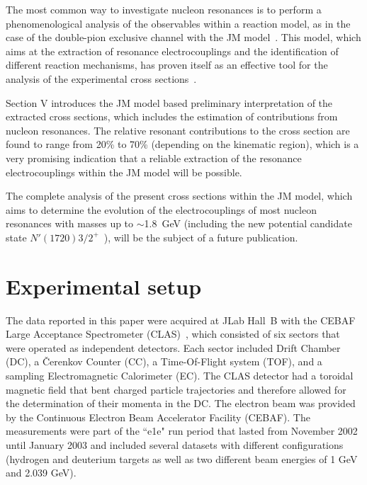 \documentclass[prc,twocolumn,superscriptaddress,showpacs,amssymb,amsmath,amsfonts,aps,nofootinbib]{revtex4-1}
\begin{document}
The most common way to investigate  nucleon resonances  is to perform a phenomenological analysis of the observables within a reaction model, as in the case of the double-pion exclusive channel with the JM  model~\cite{Mokeev:2015lda}. This model, which aims at the extraction of resonance electrocouplings and the identification of different reaction mechanisms, has proven itself as an effective tool for the analysis of the experimental cross sections~\cite{Mokeev:2008iw,Mokeev:2012vsa,Mokeev:2015lda}.





Section V introduces the JM model based preliminary interpretation of the extracted cross sections, which includes the estimation of  contributions from nucleon resonances. 
The relative resonant contributions to the cross section are found to range from 20\% to 70\% (depending on the kinematic region), which is a very promising indication that a reliable extraction of the resonance electrocouplings within the JM model will be possible.


The complete analysis of the present cross sections within the JM model, which aims to determine the evolution of the electrocouplings of most nucleon resonances  with masses up to $\sim$1.8~GeV (including the new potential candidate state
$N'(1720)3/2^+$~\cite{Mokeev:2015moa}), will be the subject of a future publication. 





\section{Experimental setup}



The data reported in this paper were acquired at JLab Hall~B  with the CEBAF Large Acceptance Spectrometer (CLAS)~\cite{Me03}, which consisted of six sectors that were operated as independent detectors. Each sector included Drift Chamber (DC), a \v Cerenkov Counter (CC), a Time-Of-Flight system (TOF), and a sampling Electromagnetic Calorimeter (EC). The CLAS detector had a toroidal magnetic field that bent charged particle trajectories and therefore allowed for the determination of their momenta in the DC.
The electron beam was provided by the Continuous Electron Beam Accelerator Facility (CEBAF).
The measurements were part of the  ``e1e" run period that lasted from November 2002 until January 2003 and included several datasets with different configurations (hydrogen and deuterium targets as well as two different beam energies of 1 GeV and 2.039 GeV). 
 
\end{document}
